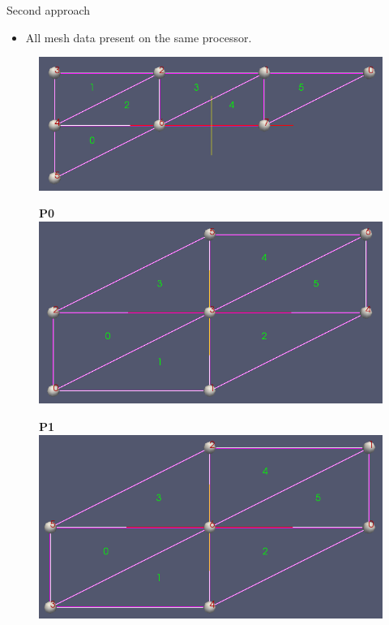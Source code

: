 \documentclass[t,english]{beamer}
\begin{document}
\begin{frame}{Second approach}
\begin{itemize}
\item All mesh data present on the same processor. 
\end{itemize}
\begin{figure}[!htb]
\centering
{}
\centering
\includegraphics[scale=0.15]{./p0.png}

\textbf{P0}
\endminipage\hfill
\centering
{}
\centering
\includegraphics[scale=0.115]{./p1.png}

\textbf{P1}
\endminipage\hfill
\centering
{}
\centering
\includegraphics[scale=0.115]{./p2.png}


\end{figure}
\end{frame}
\end{document}
